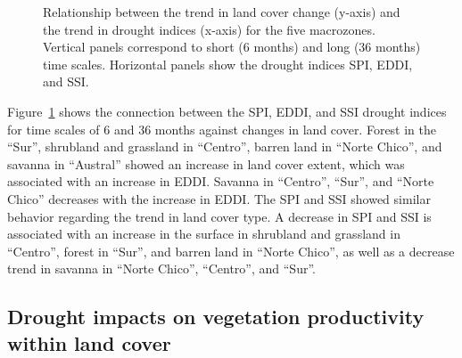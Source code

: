 \documentclass[
  authoryear,
  preprint,
  3p,
  onecolumn]{elsarticle}
\begin{document}
\begin{figure}[!ht]


\caption{\label{fig-TrendsLandDrought}Relationship between the trend in
land cover change (y-axis) and the trend in drought indices (x-axis) for
the five macrozones. Vertical panels correspond to short (6 months) and
long (36 months) time scales. Horizontal panels show the drought indices
SPI, EDDI, and SSI.}

\end{figure}%

Figure~\ref{fig-TrendsLandDrought} shows the connection between the SPI,
EDDI, and SSI drought indices for time scales of 6 and 36 months against
changes in land cover. Forest in the ``Sur'', shrubland and grassland in
``Centro'', barren land in ``Norte Chico'', and savanna in ``Austral''
showed an increase in land cover extent, which was associated with an
increase in EDDI. Savanna in ``Centro'', ``Sur'', and ``Norte Chico''
decreases with the increase in EDDI. The SPI and SSI showed similar
behavior regarding the trend in land cover type. A decrease in SPI and
SSI is associated with an increase in the surface in shrubland and
grassland in ``Centro'', forest in ``Sur'', and barren land in ``Norte
Chico'', as well as a decrease trend in savanna in ``Norte Chico'',
``Centro'', and ``Sur''.

\subsection{Drought impacts on vegetation productivity within land
cover}\label{drought-impacts-on-vegetation-productivity-within-land-cover}
\end{document}
